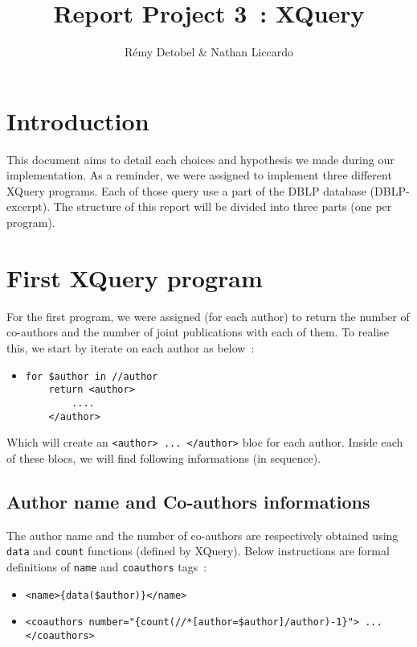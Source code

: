 \documentclass{article}
\author{R\'emy Detobel \& Nathan Liccardo}
\title{Report Project 3~: XQuery}
\begin{document}
\maketitle

\section{Introduction}
  This document aims to detail each choices and hypothesis we made during our implementation. As a reminder, we were assigned to implement three different XQuery programs. Each of those query use a part of the DBLP database (DBLP-excerpt). The structure of this report will be divided into three parts (one per program).

\section{First XQuery program}
  For the first program, we were assigned (for each author) to return the number of co-authors and the number of joint publications with each of them. To realise this, we start by iterate on each author as below~: 
  \begin{itemize}
    \item \begin{verbatim}
for $author in //author
    return <author>
        ....
    </author>\end{verbatim}
  \end{itemize}
  Which will create an \verb|<author> ... </author>| bloc for each author. Inside each of these blocs, we will find following informations (in sequence).
  
  \subsection{Author name and Co-authors informations}
    The author name and the number of co-authors are respectively obtained using \verb|data| and \verb|count| functions (defined by XQuery). Below instructions are formal definitions of \verb|name| and \verb|coauthors| tags~:
    \begin{itemize}
      \item \verb|<name>{data($author)}</name>|
      \item \verb|<coauthors number="{count(//*[author=$author]/author)-1}"> ... </coauthors>|
    \end{itemize}
    
\end{document}
